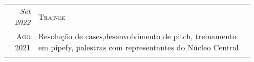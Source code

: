 \documentclass[a4paper]{article}
\begin{document}
\begin{multicols}{2}
\begin{framed}
\begin{tabular}{r|p{5cm}}
      \emph{Set 2022}   & \textsc{Trainee}                                                                                                                                                                                                                                                                                              \\
      \textsc{Ago 2021} & \footnotesize{Resolução de cases,desenvolvimento de pitch, treinamento em pipefy, palestras com representantes do Núcleo Central}                                                                                                                                                                             \\
      \multicolumn{2}{c}{}                                                                                                                                                                                                                                                                                                              \\
    \end{tabular}
  \end{framed}

\end{multicols}
\end{document}
